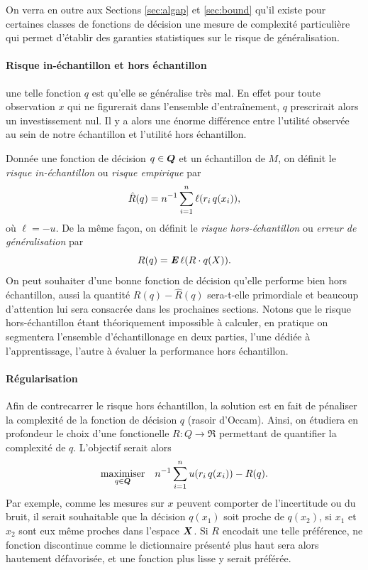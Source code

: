 On verra en outre aux Sections \ref{sec:algap} et \ref{sec:bound} qu'il existe pour
certaines classes de fonctions de décision une mesure de complexité particulière qui
permet d'établir des garanties statistiques sur le risque de généralisation. 

\paragraph{Risque in-échantillon et hors échantillon}

 une telle fonction $q$ est qu'elle se généralise très mal. En effet
pour toute observation $x$ qui ne figurerait dans l'ensemble d'entraînement, $q$
prescrirait alors un investissement nul. Il y a alors une énorme différence entre
l'utilité observée au sein de notre échantillon et l'utilité hors échantillon.

Donnée une fonction de décision $q \in \Q$ et un échantillon de $M$, on définit le
\textit{risque in-échantillon} ou \textit{risque empirique} par
\begin{equation}
  \hat R(q) = n^{-1}\sumi \ell(r_i\,q(x_i)),
\end{equation}
où $\ell = -u$. De la même façon, on définit le \textit{risque hors-échantillon} ou
\textit{erreur de généralisation} par
\begin{equation}
  R(q) = \E \ell(R \cdot q(X)).
\end{equation}
On peut souhaiter d'une bonne fonction de décision qu'elle performe bien hors échantillon,
aussi la quantité $R(q) - \hat R(q)$ sera-t-elle primordiale et beaucoup d'attention lui
sera consacrée dans les prochaines sections. Notons que le risque hors-échantillon étant
théoriquement impossible à calculer, en pratique on segmentera l'ensemble d'échantillonage
en deux parties, l'une dédiée à l'apprentissage, l'autre à évaluer la performance hors
échantillon.


\paragraph{Régularisation}

Afin de contrecarrer le risque hors échantillon, la solution est en fait de pénaliser la
complexité de la fonction de décision $q$ (rasoir d'Occam). Ainsi, on étudiera en
profondeur le choix d'une fonctionelle $R : Q \to \Re$ permettant de quantifier la complexité
de $q$. L'objectif serait alors
\begin{equation}
  \maximizeEquation[q \in \Q]{n^{-1} \sumi u(r_i\, q(x_i)) - R(q).}
\end{equation}
Par exemple, comme les mesures sur $x$ peuvent comporter de l'incertitude ou du bruit, il
serait souhaitable que la décision $q(x_1)$ soit proche de $q(x_2)$, si $x_1$ et $x_2$
sont eux même proches dans l'espace $\X$. Si $R$ encodait une telle préférence, ne
fonction discontinue comme le dictionnaire présenté plus haut sera alors hautement
défavorisée, et une fonction plus lisse y serait préférée.

